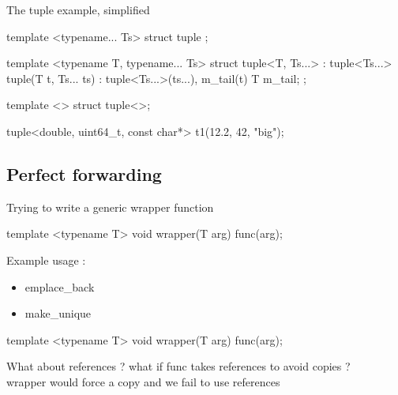 \begin{frame}[fragile]
  \begin{block}{The tuple example, simplified}
    \begin{cppcode*}{}
      template <typename... Ts> struct tuple {};
      
      template <typename T, typename... Ts>
      struct tuple<T, Ts...> : tuple<Ts...> {
        tuple(T t, Ts... ts) :
          tuple<Ts...>(ts...), m_tail(t) {}
        T m_tail;
      };

      template <> struct tuple<>{};
      
      tuple<double, uint64_t, const char*>
        t1(12.2, 42, "big");
    \end{cppcode*}
  \end{block}
\end{frame}

\subsection[forward]{Perfect forwarding}

\begin{frame}[fragile]
  Trying to write a generic wrapper function
  \begin{cppcode*}{}
    template <typename T>
    void wrapper(T arg) {
      func(arg);
    }
  \end{cppcode*}
  Example usage :
  \begin{itemize}
  \item emplace\_back
  \item make\_unique
  \end{itemize}
\end{frame}

\begin{frame}[fragile]
  \begin{cppcode*}{}
    template <typename T>
    void wrapper(T arg) {
      func(arg);
    }
  \end{cppcode*}
  \begin{alertblock}{What about references ?}
    what if func takes references to avoid copies ?\\
    wrapper would force a copy and we fail to use references
  \end{alertblock}
\end{frame}

